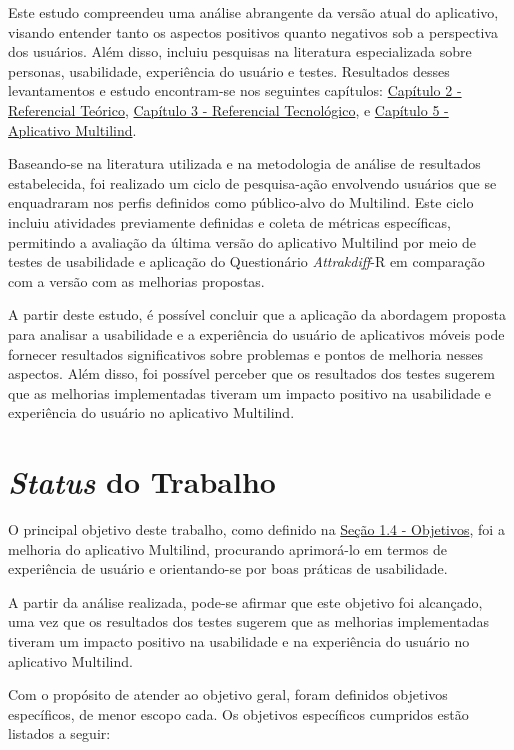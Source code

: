 Este estudo compreendeu uma análise abrangente da versão atual do aplicativo, visando entender tanto os aspectos positivos quanto negativos sob a perspectiva dos usuários. 
Além disso, incluiu pesquisas na literatura especializada sobre personas, usabilidade, experiência do usuário e testes.  Resultados desses levantamentos e estudo encontram-se 
nos seguintes capítulos: \hyperref[chap:Referencial]{Capítulo 2 - Referencial Teórico}, \hyperref[chap:ReferencialTech]{Capítulo 3 - Referencial Tecnológico}, e 
\hyperref[chap:Aplicativo Multilind]{Capítulo 5 - Aplicativo Multilind}.

Baseando-se na literatura utilizada e na metodologia de análise de resultados estabelecida, foi realizado um ciclo de pesquisa-ação envolvendo usuários que se enquadraram nos 
perfis definidos como público-alvo do Multilind. Este ciclo incluiu atividades previamente definidas e coleta de métricas específicas, permitindo a avaliação da última versão 
do aplicativo Multilind por meio de testes de usabilidade e aplicação do Questionário \textit{Attrakdiff}-R em comparação com a versão com as melhorias propostas.

A partir deste estudo, é possível concluir que a aplicação da abordagem proposta para analisar a usabilidade e a experiência do usuário de aplicativos móveis pode fornecer 
resultados significativos sobre problemas e pontos de melhoria nesses aspectos. Além disso, foi possível perceber que os resultados dos testes sugerem que as melhorias 
implementadas tiveram um impacto positivo na usabilidade e experiência do usuário no aplicativo Multilind.

\section{\textit{Status} do Trabalho}
\label{sec:Status do Trabalho}
O principal objetivo deste trabalho, como definido na \hyperref[sec:Objetivos]{Seção 1.4 - Objetivos}, foi a melhoria do aplicativo Multilind, procurando aprimorá-lo em termos 
de experiência de usuário e orientando-se por boas práticas de usabilidade.

A partir da análise realizada, pode-se afirmar que este objetivo foi alcançado, uma vez que os resultados dos testes sugerem que as melhorias implementadas tiveram um impacto 
positivo na usabilidade e na experiência do usuário no aplicativo Multilind.

Com o propósito de atender ao objetivo geral, foram definidos objetivos específicos, de menor escopo cada. Os objetivos específicos cumpridos estão listados a
seguir:

